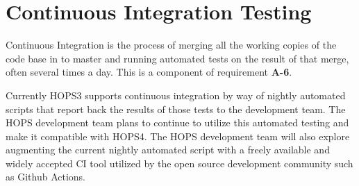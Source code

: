 %
%
\section{Continuous Integration Testing}
\label{sec:integration}

Continuous Integration is the process of merging all the working copies of the code
base in to master and running automated tests on the result of that merge, often 
several times a day. This is a component of requirement \textbf{A-6}.

Currently HOPS3 supports continuous integration by way of nightly automated scripts 
that report back the results of those tests to the development team.
The HOPS development team plans to continue to utilize this automated testing
and make it compatible with HOPS4. The HOPS development team will also explore augmenting the current 
nightly automated script with a freely available and widely accepted CI tool utilized by the open source 
development community such as Github Actions. 

\label{sec:integrationreqs}



%
%
